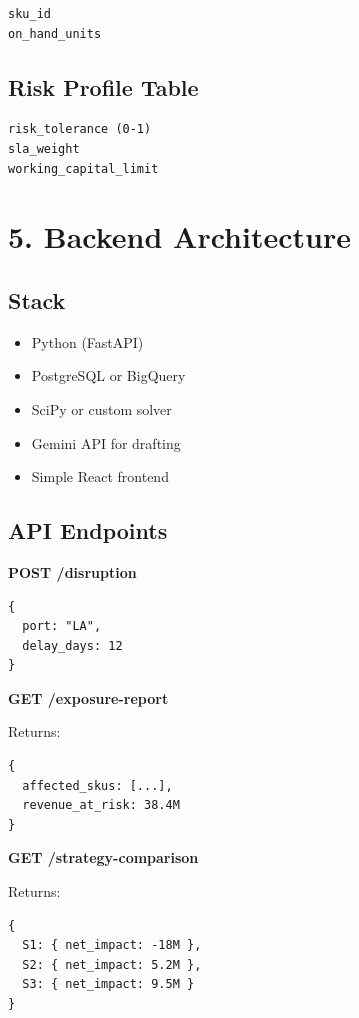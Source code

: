 \documentclass[11pt]{article}
\begin{document}
\begin{verbatim}
sku_id
on_hand_units
\end{verbatim}

\subsection*{Risk Profile Table}

\begin{verbatim}
risk_tolerance (0-1)
sla_weight
working_capital_limit
\end{verbatim}

\section*{5. Backend Architecture}

\subsection*{Stack}

\begin{itemize}
    \item Python (FastAPI)
    \item PostgreSQL or BigQuery
    \item SciPy or custom solver
    \item Gemini API for drafting
    \item Simple React frontend
\end{itemize}

\subsection*{API Endpoints}

\textbf{POST /disruption}

\begin{verbatim}
{
  port: "LA",
  delay_days: 12
}
\end{verbatim}

\textbf{GET /exposure-report}

Returns:

\begin{verbatim}
{
  affected_skus: [...],
  revenue_at_risk: 38.4M
}
\end{verbatim}

\textbf{GET /strategy-comparison}

Returns:

\begin{verbatim}
{
  S1: { net_impact: -18M },
  S2: { net_impact: 5.2M },
  S3: { net_impact: 9.5M }
}
\end{verbatim}
\end{document}
